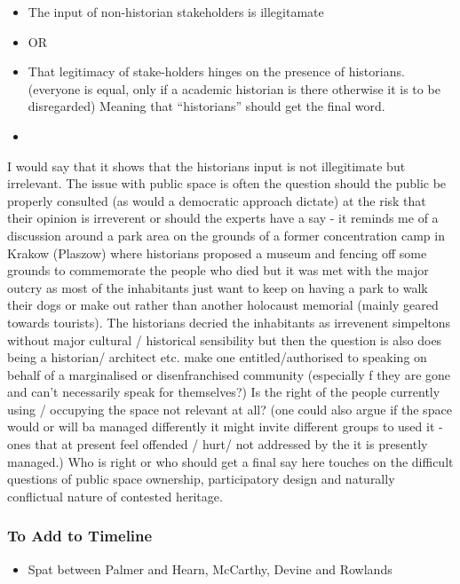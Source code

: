 \begin{itemize}
    \item The input of non-historian stakeholders is illegitamate
    \item OR
    \item That legitimacy of stake-holders hinges on the presence of historians. (everyone is equal, only if a academic historian is there otherwise it is to be disregarded) Meaning that ``historians'' should get the final word.
    \item 
\end{itemize}
I would say that it shows that the historians input is not illegitimate but irrelevant. The issue with public space is often the question should the public be properly consulted (as would a democratic approach dictate) at the risk that their opinion is irreverent or should the experts have a say - it reminds me of a discussion around a park area on the grounds of a former concentration camp in Krakow (Plaszow) where historians proposed a museum and fencing off some grounds to commemorate the people who died but it was met with the major outcry as most of the inhabitants just want to keep on having a park to walk their dogs or make out rather than another holocaust memorial (mainly geared towards tourists). The historians decried the inhabitants as irrevenent simpeltons without major cultural / historical sensibility but then the question is also does being a historian/ architect etc. make one entitled/authorised to speaking on behalf of a marginalised or disenfranchised community (especially f they are gone and can't necessarily speak for themselves?) Is the right of the people currently using / occupying the space not relevant at all? (one could also argue if the space would or will ba managed differently it might invite different groups to used it - ones that at present feel offended / hurt/ not addressed by the it is presently managed.) Who is right or who should get a final say here touches on the difficult questions of public space ownership, participatory design and naturally conflictual nature of contested heritage. 


\subsubsection{To Add to Timeline}

\begin{itemize}
    \item Spat between Palmer and  Hearn, McCarthy, Devine and Rowlands
\end{itemize}

